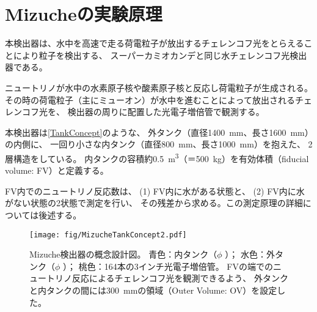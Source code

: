 
\section{Mizucheの実験原理}

本検出器は、水中を高速で走る荷電粒子が放出するチェレンコフ光をとらえることにより粒子を検出する、
スーパーカミオカンデと同じ水チェレンコフ光検出器である。

ニュートリノが水中の水素原子核や酸素原子核と反応し荷電粒子が生成される。
その時の荷電粒子（主にミューオン）が水中を進むことによって放出されるチェレンコフ光を、
検出器の周りに配置した光電子増倍管で観測する。


本検出器は\autoref{TankConcept}のような、
外タンク（直径\qty{1400}{\mm}、長さ\qty{1600}{\mm}）の内側に、
一回り小さな内タンク（直径\qty{800}{\mm}、長さ\qty{1000}{\mm}）を抱えた、
2層構造をしている。
内タンクの容積約\qty{0.5}{\cubic\meter}（＝\qty{500}{\kg}）を有効体積（fiducial volume: FV）と定義する。

FV内でのニュートリノ反応数は、
(1) FV内に水がある状態と、
(2) FV内に水がない状態の2状態で測定を行い、
その残差から求める。この測定原理の詳細については後述する。

\begin{figure}[htb]
  \centering
  \texttt{[image: fig/MizucheTankConcept2.pdf]}
  \caption[Mizuche検出器の概念設計図]{
    Mizuche検出器の概念設計図。
    青色：内タンク（$\phi$ ）；
    水色：外タンク（$\phi$ ）；
    桃色：164本の3インチ光電子増倍管。
    FVの端でのニュートリノ反応によるチェレンコフ光を観測できるよう、
    外タンクと内タンクの間には\qty{300}{\mm}の領域（Outer Volume: OV）を設定した。
  }
\label{TankConcept}
\end{figure}


